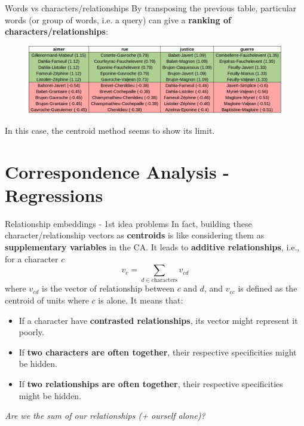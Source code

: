 \documentclass[10pt]{beamer}
\newcommand{\imp}[1]{\textbf{\color{cyan}#1}}
\begin{document}
	\begin{frame}{Words vs characters/relationships}
		By transposing the previous table, particular words (or group of words, i.e. a query) can give a \imp{ranking of characters/relationships}:
		\begin{figure}
			\centering
			\includegraphics[width=\textwidth]{img/word_vs_occ.png}
		\end{figure}
		In this case, the centroid method seems to show its limit.
	\end{frame}
	
	
	
	\section[Correspondence Analysis - Regressions]{Correspondence Analysis - Regressions}
	
	
	\begin{frame}{Relationship embeddings - 1st idea problems}
		In fact, building these character/relationship vectors as \imp{centroids} is like considering them as \imp{supplementary variables} in the CA. It leads to \imp{additive relationships}, i.e., for a character $c$
		$$
		v_{c} = \sum_{d \in \text{characters}} v_{cd}
		$$
		where $v_{cd}$ is the vector of relationship between $c$ and $d$, and $v_{cc}$ is defined as the centroid of units where $c$ is alone. It means that:
		\begin{itemize}
			\item If a character have \imp{contrasted relationships}, its vector might represent it poorly.
			\item If \imp{two characters are often together}, their respective specificities might be hidden.
			\item If \imp{two relationships are often together}, their respective specificities might be hidden.
		\end{itemize}
		\emph{Are we the sum of our relationships (+ ourself alone)?} 
	\end{frame}
	
\end{document}
